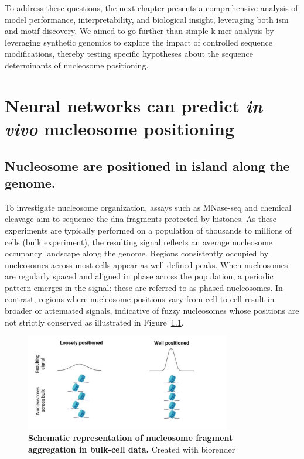 \documentclass[11pt]{book}
\begin{document}
To address these questions, the next chapter presents a comprehensive analysis of model performance, interpretability, and biological insight, leveraging both \gls{ism} and motif discovery. We aimed to go further than simple k-mer analysis by leveraging synthetic genomics to explore the impact of controlled sequence modifications, thereby testing specific hypotheses about the sequence determinants of nucleosome positioning.
 

\chapter{Neural networks can predict \textit{in vivo} nucleosome positioning}
\section{Nucleosome are positioned in island along the genome.}
To investigate nucleosome organization, assays such as MNase-seq and chemical cleavage aim to sequence the \gls{dna} fragments protected by histones. As these experiments are typically performed on a population of thousands to millions of cells (bulk experiment), the resulting signal reflects an average nucleosome occupancy landscape along the genome. Regions consistently occupied by nucleosomes across most cells appear as well-defined peaks. When nucleosomes are regularly spaced and aligned in phase across the population, a periodic pattern emerges in the signal: these are referred to as phased nucleosomes. In contrast, regions where nucleosome positions vary from cell to cell result in broader or attenuated signals, indicative of fuzzy nucleosomes whose positions are not strictly conserved as illustrated in Figure~\ref{fig:fuzzy_nuc}. 

\begin{figure}[htbp]
    \centering
    \includegraphics[width=0.8\textwidth]{Figures/Results/fuzzy_nucleosomes.pdf}
    \caption{\textbf{Schematic representation of nucleosome fragment aggregation in bulk-cell data.} Created with biorender}
    \label{fig:fuzzy_nuc}
\end{figure}
\end{document}
